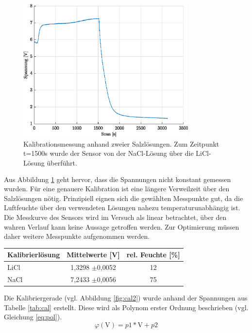 \begin{figure}[H]
	\centering
	\includegraphics[width=0.8\textwidth]{../DATA/Messreihe_Feuchtekalibration.eps}
	\caption[Kalibrationsmessung]{Kalibrationsmessung anhand zweier Salzlösungen. Zum Zeitpunkt t=1500s wurde der Sensor von der NaCl-Lösung über die LiCl-Lösung überführt.}
	\label{fig:cal}
\end{figure}

Aus Abbildung \ref{fig:cal} geht hervor, dass die Spannungen nicht konstant gemessen wurden. Für eine genauere Kalibration ist eine längere Verweilzeit über den Salzlösungen nötig. Prinzipiell eignen sich die gewählten Messpunkte gut, da die Luftfeuchte über den verwendeten Lösungen nahezu temperaturunabhängig ist. Die Messkurve des Sensors wird im Versuch als linear betrachtet, über den wahren Verlauf kann keine Aussage getroffen werden. Zur Optimierung müssen daher weitere Messpunkte aufgenommen werden.
\begin{center}
	\begin{tabular}{l|c|c}
		\label{tab:cal}
		
		\textbf{Kalibrierlösung} & \textbf{Mittelwerte} [V] & rel. Feuchte [\%]\\
		\hline
		LiCl & 1,3298 $\pm$0,0052 & 12\\
		NaCl & 7,2433 $\pm$0,0056 & 75
	\end{tabular}
\end{center}

Die Kalibriergerade (vgl. Abbildung \ref{fig:cal2}) wurde anhand der Spannungen aus Tabelle \ref{tab:cal} erstellt. Diese wird als Polynom erster Ordnung beschrieben (vgl. Gleichung \ref{eq:pol}).
\begin{equation}
	\label{eq:pol}
	\varphi(\text{V}) = p1*\text{V} + p2
\end{equation}

